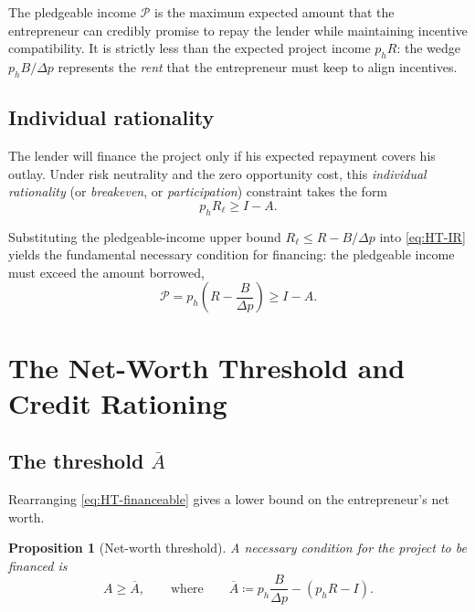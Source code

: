\documentclass[11pt,a4paper,oneside]{book}
\def\leq{\leqslant}
\def\geq{\geqslant}
\theoremstyle{plain}
\newtheorem{proposition}[theorem]{Proposition}
\theoremstyle{definition}
\theoremstyle{remark}
\numberwithin{equation}{chapter}
\begin{document}
The pledgeable income $\mathcal{P}$ is the maximum expected amount that the entrepreneur can credibly promise to repay the lender while maintaining incentive compatibility.
It is strictly less than the expected project income $p_h R$: the wedge $p_h B / \Delta p$ represents the \emph{rent} that the entrepreneur must keep to align incentives.

\subsection{Individual rationality}

The lender will finance the project only if his expected repayment covers his outlay.
Under risk neutrality and the zero opportunity cost, this \emph{individual rationality} (or \emph{breakeven}, or \emph{participation}) constraint takes the form
\begin{equation}\label{eq:HT-IR}
  p_h R_\ell \geq I - A.
  \tag{IR}
\end{equation}

Substituting the pledgeable-income upper bound $R_\ell \leq R - B/\Delta p$ into \eqref{eq:HT-IR} yields the fundamental necessary condition for financing: the pledgeable income must exceed the amount borrowed,
\begin{equation}\label{eq:HT-financeable}
  \mathcal{P} = p_h \left( R - \frac{B}{\Delta p} \right) \geq I - A.
\end{equation}

\section{The Net-Worth Threshold and Credit Rationing}
\label{sec:HT-threshold}

\subsection{The threshold \texorpdfstring{$\overline{A}$}{A-bar}}

Rearranging \eqref{eq:HT-financeable} gives a lower bound on the entrepreneur's net worth.

\begin{proposition}[Net-worth threshold]\label{prop:HT-threshold}
A necessary condition for the project to be financed is
\begin{equation}\label{eq:HT-threshold}
  A \geq \overline{A}, \qquad \text{where} \qquad \overline{A} \coloneqq p_h \frac{B}{\Delta p} - (p_h R - I).
\end{equation}
\end{proposition}
\end{document}
